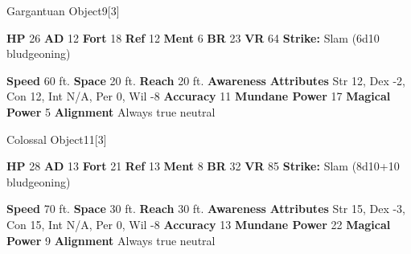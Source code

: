  

  \begin{monsubsection}{Gargantuan Object}{9}[3]
    \vspace{-1em}\vspace{-1em}
    \vspace{0em}

    
    

    \begin{spellcontent}
      \begin{spelltargetinginfo}
        \pari \textbf{HP} 26 \monsep
          \textbf{AD} 12 \monsep
          \textbf{Fort} 18 \monsep
          \textbf{Ref} 12 \monsep
          \textbf{Ment} 6
        \pari \textbf{BR} 23 \monsep
        \textbf{VR} 64
        \pari \textbf{Strike:}
            Slam  (6d10 bludgeoning)
      \end{spelltargetinginfo}
    \end{spellcontent}
    \begin{monsterfooter}
      \pari \textbf{Speed} 60 ft. \monsep
        \textbf{Space} 20 ft. \monsep
        \textbf{Reach} 20 ft.
      \pari \textbf{Awareness} 
      \pari \textbf{Attributes}
        Str 12, Dex -2,
        Con 12, Int N/A,
        Per 0, Wil -8
      \pari \textbf{Accuracy} 11 \monsep
        \textbf{Mundane Power} 17 \monsep
      \textbf{Magical Power} 5
      \pari \textbf{Alignment} Always true neutral
    \end{monsterfooter}
  \end{monsubsection}
  
  

  \begin{monsubsection}{Colossal Object}{11}[3]
    \vspace{-1em}\vspace{-1em}
    \vspace{0em}

    
    

    \begin{spellcontent}
      \begin{spelltargetinginfo}
        \pari \textbf{HP} 28 \monsep
          \textbf{AD} 13 \monsep
          \textbf{Fort} 21 \monsep
          \textbf{Ref} 13 \monsep
          \textbf{Ment} 8
        \pari \textbf{BR} 32 \monsep
        \textbf{VR} 85
        \pari \textbf{Strike:}
            Slam  (8d10+10 bludgeoning)
      \end{spelltargetinginfo}
    \end{spellcontent}
    \begin{monsterfooter}
      \pari \textbf{Speed} 70 ft. \monsep
        \textbf{Space} 30 ft. \monsep
        \textbf{Reach} 30 ft.
      \pari \textbf{Awareness} 
      \pari \textbf{Attributes}
        Str 15, Dex -3,
        Con 15, Int N/A,
        Per 0, Wil -8
      \pari \textbf{Accuracy} 13 \monsep
        \textbf{Mundane Power} 22 \monsep
      \textbf{Magical Power} 9
      \pari \textbf{Alignment} Always true neutral
    \end{monsterfooter}
  \end{monsubsection}
  
